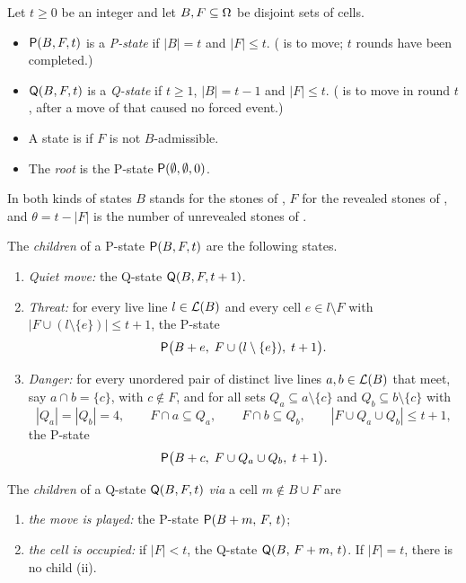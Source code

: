 \begin{definition}\label{def:states}\label{def:children}
Let $t\ge 0$ be an integer and let $B,F\subseteq\Omega$ be disjoint sets of cells.
\begin{itemize}[leftmargin=2.2em]
\item $\mathsf{P}(B,F,t)$ is a \emph{P-state} if $|B|=t$ and $|F|\le t$. (\Maker{} is to move; $t$ rounds have been
  completed.)
\item $\mathsf{Q}(B,F,t)$ is a \emph{Q-state} if $t\ge 1$, $|B|=t-1$ and $|F|\le t$. (\Breaker{} is to move in round
  $t$, after a move of \Maker{} that caused no forced event.)
\item A state is \VOID{} if $F$ is not $B$-admissible.
\item The \emph{root} is the P-state $\mathsf{P}(\emptyset,\emptyset,0)$.
\end{itemize}
In both kinds of states $B$ stands for the stones of \Breaker, $F$ for the revealed stones of \Maker, and
$\theta=t-|F|$ is the number of unrevealed stones of \Maker.

The \emph{children} of a P-state $\mathsf{P}(B,F,t)$ are the following states.
\begin{enumerate}[leftmargin=2.6em]
\item[\textup{(a)}] \emph{Quiet move:} the Q-state $\mathsf{Q}(B,F,t+1)$.
\item[\textup{(c)}] \emph{Threat:} for every live line $l\in\mathcal{L}(B)$ and every cell $e\in l\setminus F$ with
  $|F\cup(l\setminus\{e\})|\le t+1$, the P-state
  \[ \mathsf{P}\bigl(B+e,\;F\cup(l\setminus\{e\}),\;t+1\bigr). \]
\item[\textup{(d)}] \emph{Danger:} for every unordered pair of distinct live lines $a,b\in\mathcal{L}(B)$ that meet,
  say $a\cap b=\{c\}$, with $c\notin F$, and for all sets $Q_a\subseteq a\setminus\{c\}$ and
  $Q_b\subseteq b\setminus\{c\}$ with
  \[ |Q_a|=|Q_b|=4,\qquad F\cap a\subseteq Q_a,\qquad F\cap b\subseteq Q_b,\qquad |F\cup Q_a\cup Q_b|\le t+1, \]
  the P-state
  \[ \mathsf{P}\bigl(B+c,\;F\cup Q_a\cup Q_b,\;t+1\bigr). \]
\end{enumerate}
The \emph{children} of a Q-state $\mathsf{Q}(B,F,t)$ \emph{via} a cell $m\notin B\cup F$ are
\begin{enumerate}[leftmargin=2.6em]
\item[\textup{(i)}] \emph{the move is played:} the P-state $\mathsf{P}(B+m,\,F,\,t)$;
\item[\textup{(ii)}] \emph{the cell is occupied:} if $|F|<t$, the Q-state $\mathsf{Q}(B,\,F+m,\,t)$. If $|F|=t$,
  there is no child \textup{(ii)}.
\end{enumerate}
\end{definition}

